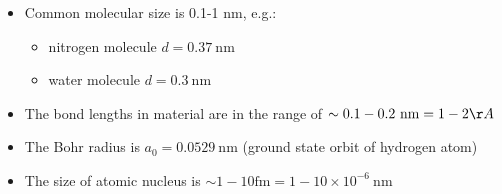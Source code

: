 \begin{frame}%
\frametitle{\texorpdfstring{\culine[\sectiontitleulinecolor]{\sectiontitle}}{\sectiontitle} }

\begin{itemize}
	\item Common molecular size is 0.1-1 nm, e.g.:
\begin{itemize}
	\item nitrogen molecule $d=0.37 \mathrm{~nm}$
\item water molecule $d=0.3 \mathrm{~nm}$
\end{itemize}

\item The bond lengths in material are in the range of $\sim 0.1-0.2 \mathrm{~nm}=1-2 \AA$

\item The Bohr radius is $a_{0}=0.0529 \mathrm{~nm}$ (ground state orbit of hydrogen atom)

\item The size of atomic nucleus is $\sim 1-10 \mathrm{fm}=1-10 \times 10^{-6} \mathrm{~nm}$
\end{itemize}
%
%

\endofslide 
\end{frame}

